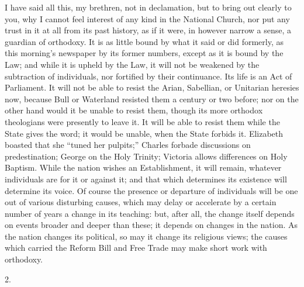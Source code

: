I have said all this, my brethren, not in declamation, but to bring
out clearly to you, why I cannot feel interest of any kind in the
National Church, nor put any trust in it at all from its past history,
as if it were, in however narrow a sense, a guardian of orthodoxy. It
is as little bound by what it said or did formerly, as this morning's
newspaper by its former numbers, except as it is bound by the Law; and
while it is upheld by the Law, it will not be weakened by the
subtraction of individuals, nor fortified by their continuance. Its
life is an Act of Parliament. It will not be able to resist the Arian,
Sabellian, or Unitarian heresies now, because Bull or Waterland
resisted them a century or two before; nor on the other hand would it
be unable to resist them, though its more orthodox theologians were
presently to leave it. It will be able to resist them while the State
gives the word; it would be unable, when the State forbids it.
Elizabeth boasted that she ``tuned her pulpits;'' Charles
forbade discussions on predestination; George on the Holy Trinity;
Victoria allows differences on Holy Baptism. While the nation wishes
an Establishment, it will remain, whatever individuals are for it or
against it; and that which determines its existence will determine its
voice. Of course the presence or departure of individuals will be one
out of various disturbing causes, which may delay or accelerate by a
certain number of years a change in its teaching: but, after all, the
change itself depends on events broader and deeper than these; it
depends on changes in the nation. As the nation changes its political,
so may it change its religious views; the causes which carried the
Reform Bill and Free Trade may make short work with orthodoxy.

2.

